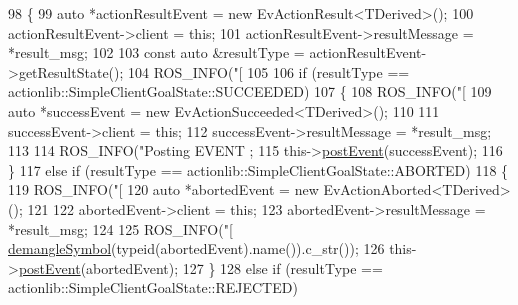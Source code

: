 \begin{DoxyCode}
98     \{
99         \textcolor{keyword}{auto} *actionResultEvent = \textcolor{keyword}{new} EvActionResult<TDerived>();
100         actionResultEvent->client = \textcolor{keyword}{this};
101         actionResultEvent->resultMessage = *result\_msg;
102 
103         \textcolor{keyword}{const} \textcolor{keyword}{auto} &resultType = actionResultEvent->getResultState();
104         ROS\_INFO(\textcolor{stringliteral}{"[%
105 
106         \textcolor{keywordflow}{if} (resultType == actionlib::SimpleClientGoalState::SUCCEEDED)
107         \{
108             ROS\_INFO(\textcolor{stringliteral}{"[%
109             \textcolor{keyword}{auto} *successEvent = \textcolor{keyword}{new} EvActionSucceeded<TDerived>();
110 
111             successEvent->client = \textcolor{keyword}{this};
112             successEvent->resultMessage = *result\_msg;
113 
114             ROS\_INFO(\textcolor{stringliteral}{"Posting EVENT %
      ;
115             this->\hyperlink{classsmacc_1_1ISmaccClient_a46cbc0d695214efe40d29247323bfc80}{postEvent}(successEvent);
116         \}
117         \textcolor{keywordflow}{else} \textcolor{keywordflow}{if} (resultType == actionlib::SimpleClientGoalState::ABORTED)
118         \{
119             ROS\_INFO(\textcolor{stringliteral}{"[%
120             \textcolor{keyword}{auto} *abortedEvent = \textcolor{keyword}{new} EvActionAborted<TDerived>();
121 
122             abortedEvent->client = \textcolor{keyword}{this};
123             abortedEvent->resultMessage = *result\_msg;
124 
125             ROS\_INFO(\textcolor{stringliteral}{"[%
      \hyperlink{namespacesmacc_a458f5e70d468824fbcd66cc7729deaa8}{demangleSymbol}(\textcolor{keyword}{typeid}(abortedEvent).name()).c\_str());
126             this->\hyperlink{classsmacc_1_1ISmaccClient_a46cbc0d695214efe40d29247323bfc80}{postEvent}(abortedEvent);
127         \}
128         \textcolor{keywordflow}{else} \textcolor{keywordflow}{if} (resultType == actionlib::SimpleClientGoalState::REJECTED)
}}}}}
\end{DoxyCode}
